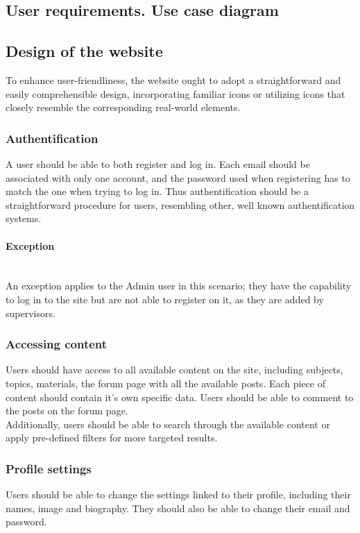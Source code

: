 \documentclass[12pt,a4paper]{article}
\begin{document}
\begin{spacing}{1.5}
    \subsection{User requirements. Use case diagram}\label{subsec: user_req}
    \subsection{Design of the website}
    To enhance user-friendliness, the website ought to adopt a straightforward and
    easily comprehensible design, incorporating familiar icons or utilizing icons
    that closely resemble the corresponding real-world elements.
    \subsubsection{Authentification}
    A user should be able to both register and log in. Each email should be
    associated with only one account, and the password used when registering has to
    match the one when trying to log in. Thus authentification should be a
    straightforward procedure for users, resembling other, well known
    authentification systems.
    \paragraph{Exception} \mbox{} \\ \indent An exception applies to the Admin user in
    this scenario; they have the capability to log in to the site but are not able
    to register on it, as they are added by supervisors.
    \subsubsection{Accessing content}
    Users should have access to all available content on the site, including
    subjects, topics, materials, the forum page with all the available posts. Each
    piece of content should contain it's own specific data. Users should be able to
    comment to the posts on the forum page. \\ \indent Additionally, users should
    be able to search through the available content or apply pre-defined filters
    for more targeted results.
    \subsubsection{Profile settings}
    Users should be able to change the settings linked to their profile, including
    their names, image and biography. They should also be able to change their
    email and password.

\end{spacing}
\end{document}
